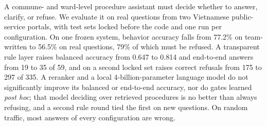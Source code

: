 A commune- and ward-level procedure assistant must decide whether to answer, clarify, or refuse. We evaluate it
on real questions from two Vietnamese public-service portals, with test sets locked before the code and
one run per configuration. On one frozen system, behavior accuracy falls from 77.2\% on team-written to 56.5\% on real questions,
79\% of which must be refused. A transparent rule layer raises balanced accuracy from 0.647 to 0.814 and end-to-end answers from 19 to
35 of 59, and on a second locked set raises correct refusals from 175 to 297 of 335. A reranker and a local 4-billion-parameter language
model do not significantly improve its balanced or end-to-end accuracy, nor do gates learned \emph{post hoc}; that model deciding over
retrieved procedures is no better than always refusing, and a second rule round tied the first on new questions. On random traffic,
most answers of every configuration are wrong.
